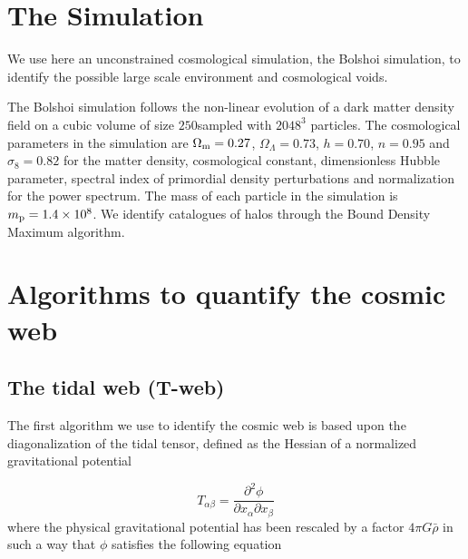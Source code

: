 \documentclass[a4,useAMS,usenatbib,usegraphicx]{latex/mn2e}
\begin{document}
\section{The Simulation}
\label{sec:the_simulation}


We use here an unconstrained cosmological simulation, the Bolshoi 
simulation, to identify the possible large scale environment and 
cosmological voids.


The Bolshoi simulation follows the non-linear evolution of a dark matter 
density field on a cubic volume of size $250$\hMpc sampled with $2048^3$ 
particles. The cosmological parameters in the simulation are 
$\Omega_{\rm m}=0.27$, $\Omega_{\Lambda}=0.73$, $h=0.70$, $n=0.95$ and 
$\sigma_{8}=0.82$ for the matter density, cosmological constant, 
dimensionless Hubble parameter, spectral index of primordial density 
perturbations and normalization for the power spectrum. The mass of each 
particle in the simulation is $m_{\rm p}=1.4\times 10^{8}$\hMsun.
We identify catalogues of halos through the Bound Density Maximum 
algorithm.



\section{Algorithms to quantify the cosmic web}
\label{sec:algorithms_cosmic_web}



\subsection{The tidal web (T-web)}
\label{subsec:Tweb}



The first algorithm  we use to identify the cosmic web is based upon the
diagonalization of the tidal tensor, defined as the Hessian of a 
normalized gravitational potential  


\begin{equation}
T_{\alpha\beta} = \frac{\partial^2\phi}{\partial x_{\alpha}\partial x_{\beta}}
\end{equation}
where the physical gravitational potential has been rescaled by a factor 
$4\pi G\bar{\rho}$ in such a way that $\phi$ satisfies the following 
equation
\end{document}
